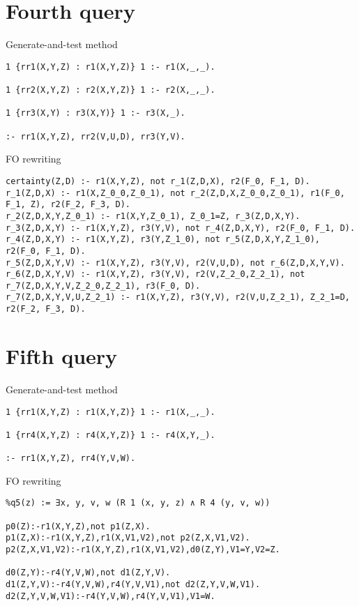 

\section{Fourth query}

Generate-and-test method

\lstset{breaklines=true}
\begin{lstlisting}
1 {rr1(X,Y,Z) : r1(X,Y,Z)} 1 :- r1(X,_,_).

1 {rr2(X,Y,Z) : r2(X,Y,Z)} 1 :- r2(X,_,_).

1 {rr3(X,Y) : r3(X,Y)} 1 :- r3(X,_).

:- rr1(X,Y,Z), rr2(V,U,D), rr3(Y,V). 
\end{lstlisting}

FO rewriting

\begin{lstlisting}
certainty(Z,D) :- r1(X,Y,Z), not r_1(Z,D,X), r2(F_0, F_1, D).
r_1(Z,D,X) :- r1(X,Z_0_0,Z_0_1), not r_2(Z,D,X,Z_0_0,Z_0_1), r1(F_0, F_1, Z), r2(F_2, F_3, D).
r_2(Z,D,X,Y,Z_0_1) :- r1(X,Y,Z_0_1), Z_0_1=Z, r_3(Z,D,X,Y).
r_3(Z,D,X,Y) :- r1(X,Y,Z), r3(Y,V), not r_4(Z,D,X,Y), r2(F_0, F_1, D).
r_4(Z,D,X,Y) :- r1(X,Y,Z), r3(Y,Z_1_0), not r_5(Z,D,X,Y,Z_1_0), r2(F_0, F_1, D).
r_5(Z,D,X,Y,V) :- r1(X,Y,Z), r3(Y,V), r2(V,U,D), not r_6(Z,D,X,Y,V).
r_6(Z,D,X,Y,V) :- r1(X,Y,Z), r3(Y,V), r2(V,Z_2_0,Z_2_1), not r_7(Z,D,X,Y,V,Z_2_0,Z_2_1), r3(F_0, D).
r_7(Z,D,X,Y,V,U,Z_2_1) :- r1(X,Y,Z), r3(Y,V), r2(V,U,Z_2_1), Z_2_1=D, r2(F_2, F_3, D).
\end{lstlisting}

\section{Fifth query}

Generate-and-test method


\begin{lstlisting}
1 {rr1(X,Y,Z) : r1(X,Y,Z)} 1 :- r1(X,_,_).

1 {rr4(X,Y,Z) : r4(X,Y,Z)} 1 :- r4(X,Y,_).

:- rr1(X,Y,Z), rr4(Y,V,W). 
\end{lstlisting}

FO rewriting


\begin{lstlisting}
%q5(z) := ∃x, y, v, w (R 1 (x, y, z) ∧ R 4 (y, v, w))

p0(Z):-r1(X,Y,Z),not p1(Z,X).
p1(Z,X):-r1(X,Y,Z),r1(X,V1,V2),not p2(Z,X,V1,V2).
p2(Z,X,V1,V2):-r1(X,Y,Z),r1(X,V1,V2),d0(Z,Y),V1=Y,V2=Z.

d0(Z,Y):-r4(Y,V,W),not d1(Z,Y,V).
d1(Z,Y,V):-r4(Y,V,W),r4(Y,V,V1),not d2(Z,Y,V,W,V1).
d2(Z,Y,V,W,V1):-r4(Y,V,W),r4(Y,V,V1),V1=W.
\end{lstlisting}

